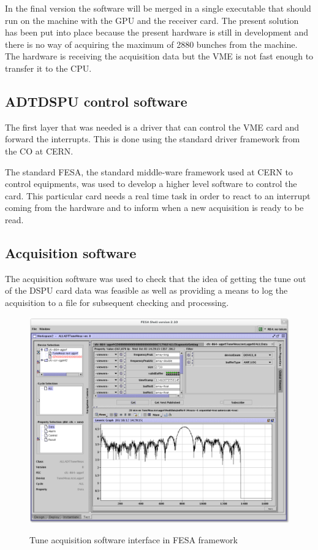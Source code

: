 In the final version the software will be merged in a single executable that should run on the machine with the \gls{GPU} and the receiver card. The present solution has been put into place because the present hardware is still in development and there is no way of acquiring the maximum of 2880 bunches from the machine. The hardware is receiving the acquisition data but the \gls{VME} is not fast enough to transfer it to the \gls{CPU}.

\subsection{ADTDSPU control software}

The first layer that was needed is a driver that can control the \gls{VME} card and forward the interrupts. This is done using the standard driver framework from the \gls{CO} at \gls{CERN}.

The standard \gls{FESA}, the standard middle-ware framework used at \gls{CERN} to control equipments, was used to develop a higher level software to control the card. This particular card needs a real time task in order to react to an interrupt coming from the hardware and to inform when a new acquisition is ready to be read.

\subsection{Acquisition software}

The acquisition software was used to check that the idea of getting the tune out of the DSPU card data was feasible as well as providing a means to log the acquisition to a file for subsequent checking and processing.

\begin{figure}[H]
\caption{Tune acquisition software interface in FESA framework}
\centering
\includegraphics[scale=0.25]{amplitude_log.pdf}
\label{fig:tuneacq}
\end{figure}

